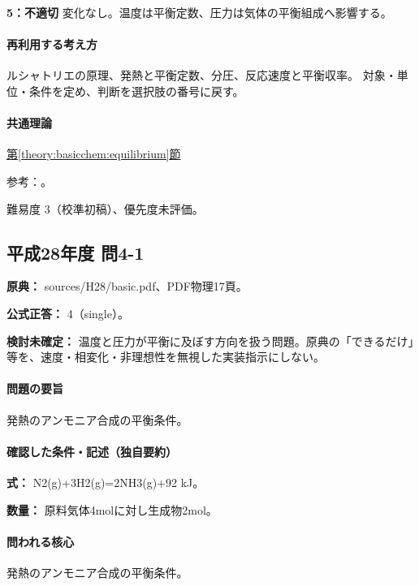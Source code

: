 \noindent\textbf{5：不適切} 変化なし。温度は平衡定数、圧力は気体の平衡組成へ影響する。\par

\paragraph{再利用する考え方} ルシャトリエの原理、発熱と平衡定数、分圧、反応速度と平衡収率。 対象・単位・条件を定め、判断を選択肢の番号に戻す。

\paragraph{共通理論} \hyperref[theory:basicchem:equilibrium]{第\ref*{theory:basicchem:equilibrium}節}

\par 参考：\cite{chem55_equilibrium}。

\par 難易度 3（校準初稿）、優先度未評価。

\subsection{平成28年度 問4-1}
\label{q:h28-reg-basic-4-1}

\noindent\textbf{原典：} sources/H28/basic.pdf、PDF物理17頁。

\textbf{公式正答：} 4（single）。

\par\textbf{検討未確定：} 温度と圧力が平衡に及ぼす方向を扱う問題。原典の「できるだけ」等を、速度・相変化・非理想性を無視した実装指示にしない。

\paragraph{問題の要旨} 発熱のアンモニア合成の平衡条件。

\paragraph{確認した条件・記述（独自要約）}\mbox{}\par

\noindent\textbf{式：} N2(g)+3H2(g)=\allowbreak{}2NH3(g)+92 kJ。\par

\noindent\textbf{数量：} 原料気体4molに対し生成物2mol。\par

\paragraph{問われる核心} 発熱のアンモニア合成の平衡条件。

